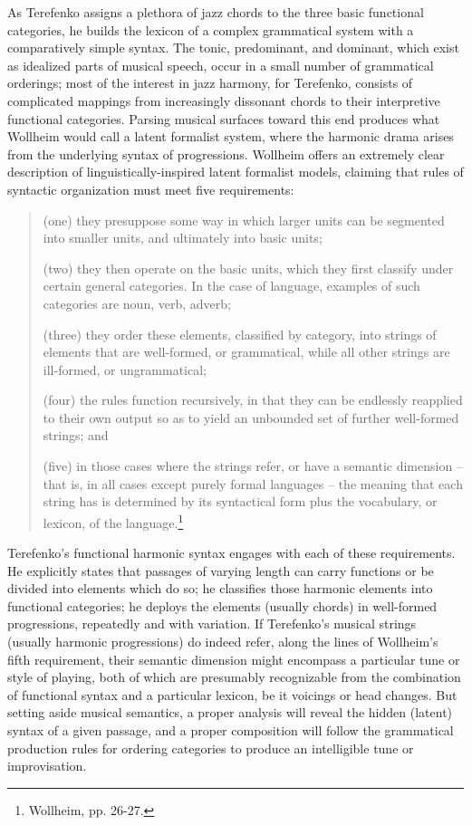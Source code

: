 As Terefenko assigns a plethora of jazz chords to the three basic functional categories, he builds the lexicon of a complex grammatical system with a comparatively simple syntax.  The tonic, predominant, and dominant, which exist as idealized parts of musical speech, occur in a small number of grammatical orderings; most of the interest in jazz harmony, for Terefenko, consists of complicated mappings from increasingly dissonant chords to their interpretive functional categories.  Parsing musical surfaces toward this end produces what Wollheim would call a latent formalist system, where the harmonic drama arises from the underlying syntax of progressions.  Wollheim offers an extremely clear description of linguistically-inspired latent formalist models, claiming that rules of syntactic organization must meet five requirements:
\begin{quote}
(one) they presuppose some way in which larger units can be segmented into smaller units, and ultimately into basic units;

(two) they then operate on the basic units, which they first classify under certain general categories.  In the case of language, examples of such categories are noun, verb, adverb;

(three) they order these elements, classified by category, into strings of elements that are well-formed, or grammatical, while all other strings are ill-formed, or ungrammatical;

(four) the rules function recursively, in that they can be endlessly reapplied to their own output so as to yield an unbounded set of further well-formed strings; and

(five) in those cases where the strings refer, or have a semantic dimension -- that is, in all cases except purely formal languages -- the meaning that each string has is determined by its syntactical form plus the vocabulary, or lexicon, of the language.\footnote{Wollheim, pp. 26-27.}
\end{quote}
Terefenko's functional harmonic syntax engages with each of these requirements.  He explicitly states that passages of varying length can carry functions or be divided into elements which do so; he classifies those harmonic elements into functional categories; he deploys the elements (usually chords) in well-formed progressions, repeatedly and with variation.  If Terefenko's musical strings (usually harmonic progressions) do indeed refer, along the lines of Wollheim's fifth requirement, their semantic dimension might encompass a particular tune or style of playing, both of which are presumably recognizable from the combination of functional syntax and a particular lexicon, be it voicings or head changes.  But setting aside musical semantics, a proper analysis will reveal the hidden (latent) syntax of a given passage, and a proper composition will follow the grammatical production rules for ordering categories to produce an intelligible tune or improvisation.

